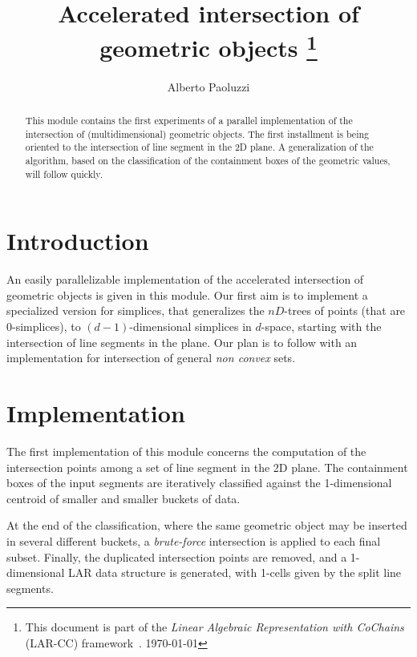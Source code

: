 \documentclass[11pt,oneside]{article}    %
\title{Accelerated intersection of geometric objects
\footnote{This document is part of the \emph{Linear Algebraic Representation with CoChains} (LAR-CC) framework~\cite{cclar-proj:2013:00}. \today}
}
\author{Alberto Paoluzzi}
\begin{document}
\maketitle
\nonstopmode

\begin{abstract}
This module contains the first experiments of a parallel implementation of the intersection of (multidimensional) geometric objects. The first installment is being oriented to the intersection of line segment in the 2D plane. A generalization of the algorithm, based on the classification of the containment boxes of the geometric values, will follow quickly.
\end{abstract}

\tableofcontents

\section{Introduction}

An easily parallelizable implementation of the accelerated intersection of geometric objects is given in this module. Our first aim is to implement a specialized version for simplices, that generalizes the $nD$-trees of points (that are 0-simplices), to $(d-1)$-dimensional simplices in $d$-space, starting with the intersection of line segments in the plane. Our plan is to follow with an implementation for intersection of general \emph{non convex} sets.


\section{Implementation}

The first implementation of this module concerns the computation of the intersection points among a set of line segment in the 2D plane. The containment boxes of the input segments are iteratively classified against the 1-dimensional centroid of smaller and smaller buckets of data. 

At the end of the classification, where the same geometric object may be inserted in several different buckets, a \emph{brute-force} intersection is applied to each final subset. Finally, the duplicated intersection points are removed, and a 1-dimensional LAR data structure is generated, with 1-cells given by the split line segments. 
\end{document}
